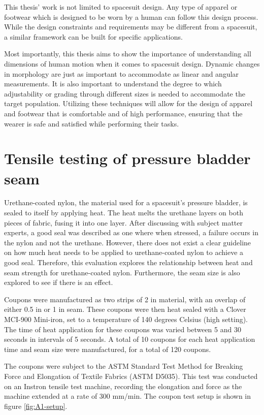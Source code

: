 \documentclass[defaultstyle,11pt]{thesis}
\begin{document}
This thesis' work is not limited to spacesuit design.
Any type of apparel or footwear which is designed to be worn by a human can follow this design process.
While the design constraints and requirements may be different from a spacesuit, a similar framework can be built for specific applications.

Most importantly, this thesis aims to show the importance of understanding all dimensions of human motion when it comes to spacesuit design.
Dynamic changes in morphology are just as important to accommodate as linear and angular measurements.
It is also important to understand the degree to which adjustability or grading through different sizes is needed to accommodate the target population.
Utilizing these techniques will allow for the design of apparel and footwear that is comfortable and of high performance, ensuring that the wearer is safe and satisfied while performing their tasks.


\appendix

\hypertarget{sec:AA}{%
\chapter{Tensile testing of pressure bladder seam}\label{sec:AA}}

Urethane-coated nylon, the material used for a spacesuit's pressure bladder, is sealed to itself by applying heat.
The heat melts the urethane layers on both pieces of fabric, fusing it into one layer.
After discussing with subject matter experts, a good seal was described as one where when stressed, a failure occurs in the nylon and not the urethane.
However, there does not exist a clear guideline on how much heat needs to be applied to urethane-coated nylon to achieve a good seal.
Therefore, this evaluation explores the relationship between heat and seam strength for urethane-coated nylon.
Furthermore, the seam size is also explored to see if there is an effect.

Coupons were manufactured as two strips of 2 in material, with an overlap of either 0.5 in or 1 in seam.
These coupons were then heat sealed with a Clover MCI-900 Mini-iron, set to a temperature of 140 degrees Celsius (high setting).
The time of heat application for these coupons was varied between 5 and 30 seconds in intervals of 5 seconds.
A total of 10 coupons for each heat application time and seam size were manufactured, for a total of 120 coupons.

The coupons were subject to the ASTM Standard Test Method for Breaking Force and Elongation of Textile Fabrics (ASTM D5035).
This test was conducted on an Instron tensile test machine, recording the elongation and force as the machine extended at a rate of 300 mm/min.
The coupon test setup is shown in figure \ref{fig:A1-setup}.
\end{document}

